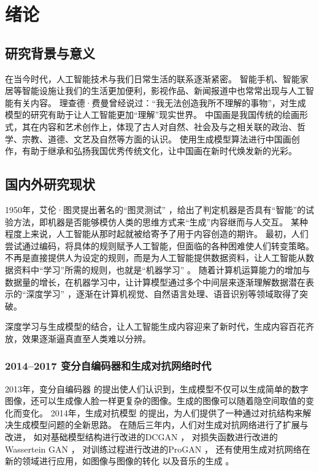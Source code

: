 \chapter{绪论}
\setcounter{page}{1}



\section{研究背景与意义}
在当今时代，人工智能技术与我们日常生活的联系逐渐紧密。
智能手机、智能家居等智能设施让我们的生活更加便利，影视作品、新闻报道中也常常出现与人工智能有关内容。
理查德·费曼曾经说过：“我无法创造我所不理解的事物”，对生成模型的研究有助于让人工智能更加“理解”现实世界。
中国画{\cite{chinesepainting}}是我国传统的绘画形式，其在内容和艺术创作上，体现了古人对自然、社会及与之相关联的政治、哲学、宗教、道德、文艺及自然等方面的认识。
使用生成模型算法进行中国画创作，有助于继承和弘扬我国优秀传统文化，让中国画在新时代焕发新的光彩。









\section{国内外研究现状}
1950年，艾伦·图灵提出著名的“图灵测试” {\cite{machinery1950computing}}，给出了判定机器是否具有“智能”的试验方法，即机器是否能够模仿人类的思维方式来“生成”内容继而与人交互。
某种程度上来说，人工智能从那时起就被给寄予了用于内容创造的期许{\cite{aigcwhitebook}}。
最初，人们尝试通过编码，将具体的规则赋予人工智能，但面临的各种困难使人们转变策略。
不再是直接提供人为设定的规则，而是为人工智能提供数据资料，让人工智能从数据资料中“学习”所需的规则，也就是“机器学习” {\cite{goodfellow2016deep}}。
随着计算机运算能力的增加与数据量的增长，在机器学习中，让计算模型通过多个中间层来逐渐理解数据潜在表示的“深度学习” {\cite{lecun2015deep}}，逐渐在计算机视觉、自然语言处理、语音识别等领域取得了突破。

深度学习与生成模型的结合，让人工智能生成内容迎来了新时代，生成内容百花齐放，效果逐渐逼真直至人类难以分辨。

\subsection{2014--2017 变分自编码器和生成对抗网络时代}
2013年，变分自编码器 {\cite{kingma2013auto}}的提出使人们认识到，生成模型不仅可以生成简单的数字图像，还可以生成像人脸一样更复杂的图像。生成的图像可以随着隐空间取值的变化而变化。
2014年，生成对抗模型 {\cite{goodfellow2020generative}}的提出，为人们提供了一种通过对抗结构来解决生成模型问题的全新思路。
在随后三年内，人们对生成对抗网络进行了扩展与改进，
如对基础模型结构进行改进的DCGAN {\cite{radford2015unsupervised}}，
对损失函数进行改进的Wassertein GAN {\cite{arjovsky2017wasserstein}}，
对训练过程进行改进的ProGAN {\cite{karras2017progressive}}，
还有使用生成对抗网络在新的领域进行应用，如图像与图像的转化 {\cite{isola2017image}\cite{zhu2017unpaired}}以及音乐的生成 {\cite{dong2018musegan}}。


